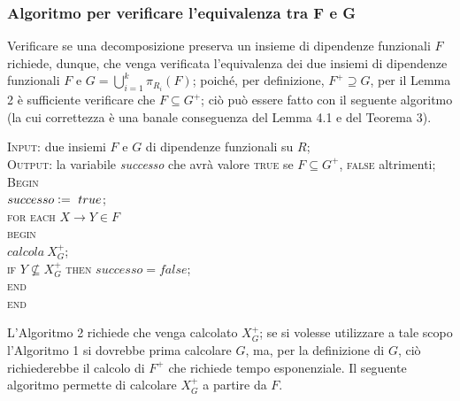 \subsubsection{Algoritmo per verificare l'equivalenza tra F e G}
Verificare se una decomposizione preserva un insieme di dipendenze funzionali $F$ richiede, dunque,
che venga verificata l'equivalenza dei due insiemi di dipendenze funzionali $F$ e $G = \bigcup_{i=1}^k
\pi_{R_i}(F)$; poiché, per definizione, $F^+ \supseteq G$, per il Lemma 2 è sufficiente verificare che $F\subseteq 
G^+$; ciò può essere fatto con il seguente algoritmo (la cui correttezza è una banale conseguenza del Lemma 4.1 e
del Teorema 3).

\begin{alg}
\textsc{Input:} due insiemi $F$ e $G$ di dipendenze funzionali su $R$;\\
\textsc{Output:} la variabile \emph{successo} che avrà valore \textsc{true} se $F\subseteq G^+$, \textsc{false}
altrimenti;\\
\textsc{Begin}\\
$successo\vcentcolon=\ true$;\\
\textsc{for each} $X \rightarrow Y \in F$\\
\indent \textsc{begin}\\
\indent $calcola\ X_{G}^+$;\\
\indent \textsc{if} $Y \not\subseteq X^+_G$ \textsc{then} $successo=false$;\\
\indent \textsc{end}\\
\textsc{end}\\
\end{alg}

L'Algoritmo 2 richiede che venga calcolato $X^{+}_G$; se si volesse utilizzare a tale scopo l'Algoritmo 1
si dovrebbe prima calcolare $G$, ma, per la definizione di $G$, ciò richiederebbe il calcolo di $F^+$ che
richiede tempo esponenziale. Il seguente algoritmo permette di calcolare $X^{+}_G$ a partire da $F$.

